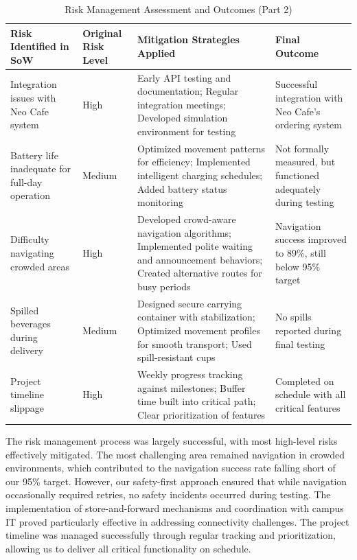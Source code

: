 \documentclass[12pt]{article}
\begin{document}
\begin{table}[H]
\centering
\begin{tabularx}{\textwidth}{|X|X|X|X|}
\hline
\textbf{Risk Identified in SoW} & \textbf{Original Risk Level} & \textbf{Mitigation Strategies Applied} & \textbf{Final Outcome} \\
\hline
Integration issues with Neo Cafe system & High & Early API testing and documentation; Regular integration meetings; Developed simulation environment for testing & Successful integration with Neo Cafe's ordering system \\
\hline
Battery life inadequate for full-day operation & Medium & Optimized movement patterns for efficiency; Implemented intelligent charging schedules; Added battery status monitoring & Not formally measured, but functioned adequately during testing \\
\hline
Difficulty navigating crowded areas & High & Developed crowd-aware navigation algorithms; Implemented polite waiting and announcement behaviors; Created alternative routes for busy periods & Navigation success improved to 89\%, still below 95\% target \\
\hline
Spilled beverages during delivery & Medium & Designed secure carrying container with stabilization; Optimized movement profiles for smooth transport; Used spill-resistant cups & No spills reported during final testing \\
\hline
Project timeline slippage & High & Weekly progress tracking against milestones; Buffer time built into critical path; Clear prioritization of features & Completed on schedule with all critical features \\
\hline
\end{tabularx}
\caption{Risk Management Assessment and Outcomes (Part 2)}
\label{tab:risk_management2}
\end{table}

The risk management process was largely successful, with most high-level risks effectively mitigated. The most challenging area remained navigation in crowded environments, which contributed to the navigation success rate falling short of our 95\% target. However, our safety-first approach ensured that while navigation occasionally required retries, no safety incidents occurred during testing. The implementation of store-and-forward mechanisms and coordination with campus IT proved particularly effective in addressing connectivity challenges. The project timeline was managed successfully through regular tracking and prioritization, allowing us to deliver all critical functionality on schedule.
\end{document}
